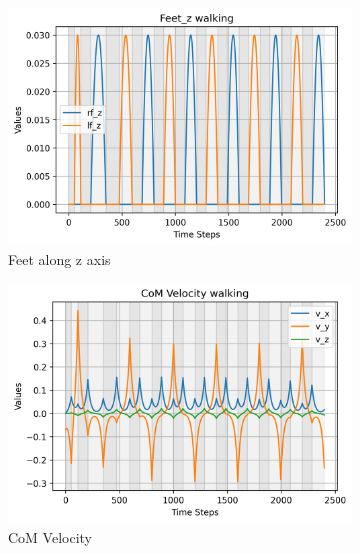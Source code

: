 \documentclass[main.tex]{subfiles}
\begin{document}
\begin{figure}[htbp]
    \centering
    \begin{subfigure}[b]{0.32\textwidth}
        \centering
        \includegraphics[width=\textwidth]{figures/Feet_z walking.png}
        \caption{Feet along z axis}
        \label{fig:sub1}
    \end{subfigure}
    \hfill
    \begin{subfigure}[b]{0.32\textwidth}
        \centering
        \includegraphics[width=\textwidth]{figures/CoM Velocity walking.png}
        \caption{CoM Velocity}
        \label{fig:sub2}
    \end{subfigure}
    \hfill
    \begin{subfigure}[b]{0.32\textwidth}
        \centering

\end{subfigure}
\end{figure}
\end{document}
